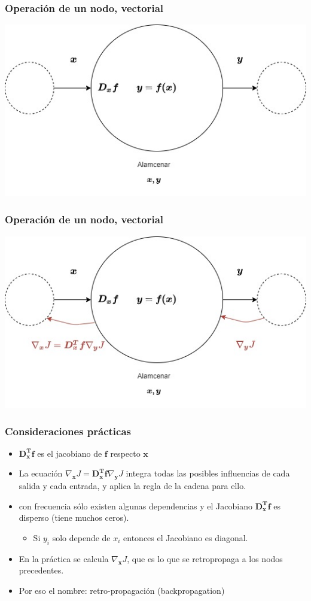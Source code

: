 \documentclass{beamer}
\begin{document}
\begin{frame}
\frametitle{Operación de un nodo, vectorial}
\includegraphics[scale=0.4]{im17}
\end{frame}
\begin{frame}
\frametitle{Operación de un nodo, vectorial}
\includegraphics[scale=0.4]{im18}
\end{frame}
\begin{frame}
\frametitle{Consideraciones prácticas}
\begin{itemize}
\item $\boldsymbol{D_x^T f}$ es el jacobiano de $\boldsymbol{f}$ respecto $\boldsymbol{x}$
\item La ecuación $\nabla_{\boldsymbol{x}} J= \boldsymbol{D_x^T f}\nabla_{\boldsymbol{y}} J$ integra todas las posibles influencias de cada salida y cada entrada, y aplica la regla de la cadena para ello.
\item con frecuencia sólo existen algunas dependencias y el Jacobiano  $\boldsymbol{D_x^T f}$ es disperso (tiene muchos ceros).
\begin{itemize}
\item Si $y_i$ solo depende de $x_i$ entonces el Jacobiano es diagonal.
\end{itemize}
\item En la práctica se calcula $\nabla_{\boldsymbol{x}} J$, que es lo que se retropropaga a los nodos precedentes.
\item Por eso el nombre: retro-propagación (backpropagation)
\end{itemize}

\end{frame}
\end{document}
